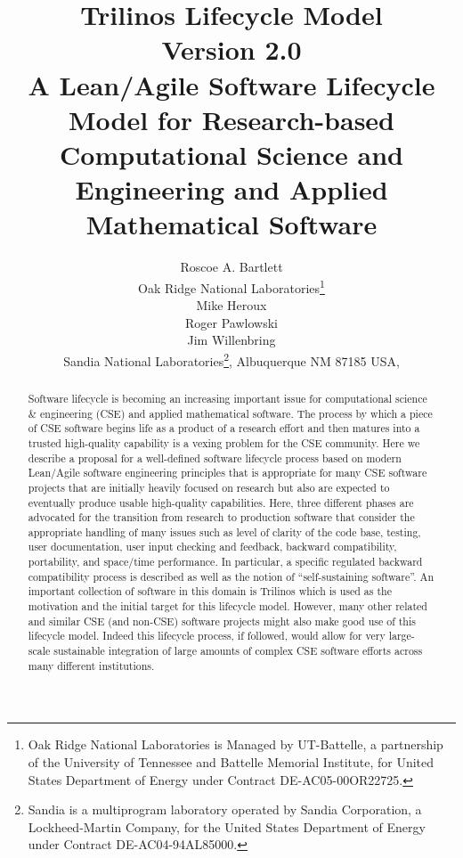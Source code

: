 \documentclass[11pt]{SANDreport}
\title{\center
Trilinos Lifecycle Model \\[2ex] Version 2.0 \\[2ex] \large A
Lean/Agile Software Lifecycle Model for Research-based Computational
Science and Engineering and Applied Mathematical Software }
\author{
Roscoe A. Bartlett \\ Oak Ridge National Laboratories\footnote{Oak
Ridge National Laboratories is Managed by UT-Battelle, a partnership
of the University of Tennessee and Battelle Memorial Institute, for
United States Department of Energy under Contract DE-AC05-00OR22725.} 
\\[2ex] Mike Heroux \\ Roger Pawlowski \\ Jim Willenbring \\ Sandia
National Laboratories\footnote{Sandia is a multiprogram laboratory
operated by Sandia Corporation, a Lockheed-Martin Company, for the
United States Department of Energy under Contract DE-AC04-94AL85000.},
Albuquerque NM 87185 USA, \\ }
\date{}
\begin{document}

\maketitle

%

%
\begin{abstract}
%

Software lifecycle is becoming an increasing important issue for
computational science \& engineering (CSE) and applied mathematical
software.  The process by which a piece of CSE software begins life as
a product of a research effort and then matures into a trusted
high-quality capability is a vexing problem for the CSE community.
Here we describe a proposal for a well-defined software lifecycle
process based on modern Lean/Agile software engineering principles
that is appropriate for many CSE software projects that are initially
heavily focused on research but also are expected to eventually
produce usable high-quality capabilities.  Here, three different
phases are advocated for the transition from research to production
software that consider the appropriate handling of many issues such as
level of clarity of the code base, testing, user documentation, user
input checking and feedback, backward compatibility, portability, and
space/time performance.  In particular, a specific regulated backward
compatibility process is described as well as the notion of
``self-sustaining software''.  An important collection of software in
this domain is Trilinos which is used as the motivation and the
initial target for this lifecycle model.  However, many other related
and similar CSE (and non-CSE) software projects might also make good
use of this lifecycle model.  Indeed this lifecycle process, if
followed, would allow for very large-scale sustainable integration of
large amounts of complex CSE software efforts across many different
institutions.

%
\end{abstract}
%

%
%
%
\end{document}

